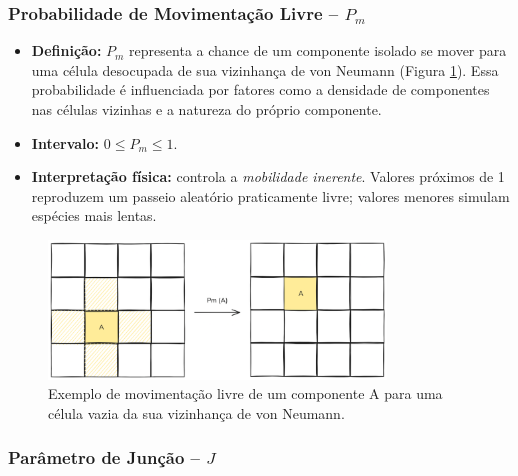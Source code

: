 \documentclass[12pt,oneside]{report}
\begin{document}
\subsubsection{Probabilidade de Movimentação Livre – \texorpdfstring{$P_m$}{Pm}}
\label{subsubsec:Pm}

\begin{itemize}
    \item \textbf{Definição:} $P_m$ representa a chance de um componente isolado se mover para uma célula desocupada de sua vizinhança de von Neumann (Figura \ref{fig:movimentacao_livre}). Essa probabilidade é influenciada por fatores como a densidade de componentes nas células vizinhas e a natureza do próprio componente.
    \item \textbf{Intervalo:} $0 \le P_m \le 1$.
    \item \textbf{Interpretação física:} controla a \textit{mobilidade inerente}.
          Valores próximos de 1 reproduzem um passeio aleatório praticamente livre; valores
          menores simulam espécies mais lentas.
\end{itemize}

\begin{figure}[H]
    \centering
    \includegraphics[width=0.8\textwidth]{Pm.png}
    \caption{\small Exemplo de movimentação livre de um componente A para uma célula vazia da sua vizinhança de von Neumann.}
    \label{fig:movimentacao_livre}
\end{figure}

\subsubsection{Parâmetro de Junção – \texorpdfstring{$J$}{J}}
\label{subsubsec:J}
\end{document}
